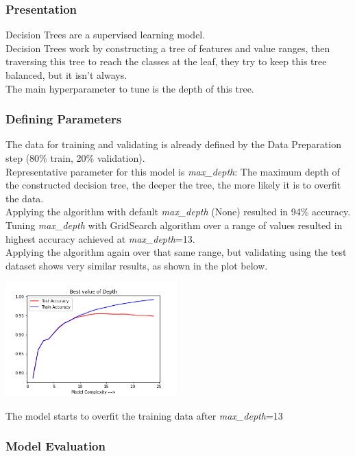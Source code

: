 \subsubsection{Presentation}
Decision Trees are a supervised learning model.\\
Decision Trees work by constructing a tree of features and value ranges, then traversing this tree to reach the classes at the leaf, they try to keep this tree balanced, but it isn't always.\\
The main hyperparameter to tune is the depth of this tree.

\subsubsection{Defining Parameters}
The data for training and validating is already defined by the Data Preparation step (80\% train, 20\% validation).\\
Representative parameter for this model is \emph{max\_depth}: The maximum depth of the constructed decision tree, the deeper the tree, the more likely it is to overfit the data.\\
Applying the algorithm with default \emph{max\_depth} (None) resulted in 94\% accuracy.\\
Tuning \emph{max\_depth} with GridSearch algorithm over a range of values resulted in highest accuracy achieved at \emph{max\_depth}=13.\\
Applying the algorithm again over that same range, but validating using the test dataset shows very similar results, as shown in the plot below.
\begin{center}
    \captionsetup{type=figure}
    \includegraphics[width=250px]{DT_complexity.png}
\end{center}
The model starts to overfit the training data after \emph{max\_depth}=13

\subsubsection{Model Evaluation}

